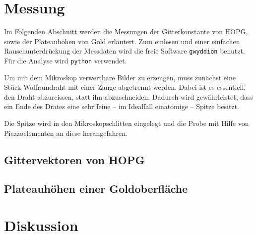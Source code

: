 \section{Messung} %
\label{sec:messung}
Im Folgenden Abschnitt werden die Messungen der Gitterkonstante von HOPG, sowie
der Plateauhöhen von Gold erläutert. Zum einlesen und einer einfachen
Rauschunterdrückung der Messdaten wird die freie Software \texttt{gwyddion}
benutzt. Für die Analyse wird \texttt{python} verwendet.

Um mit dem Mikroskop verwertbare Bilder zu erzeugen, muss zunächst eine Stück
Wolframdraht mit einer Zange abgetrennt werden. Dabei ist es essentiell, den
Draht abzureissen, statt ihn abzuschneiden. Dadurch wird gewährleistet, dass
ein Ende des Drates eine sehr feine -- im Idealfall einatomige -- Spitze
besitzt.

Die Spitze wird in den Mikroskopschlitten eingelegt und die Probe mit Hilfe von
Piezzoelementen an diese herangefahren.

\subsection{Gittervektoren von HOPG}
\label{subsec:gitter}


\subsection{Plateauhöhen einer Goldoberfläche}
\label{subsec:gold}

\section{Diskussion}
\label{sec:diskussion}
